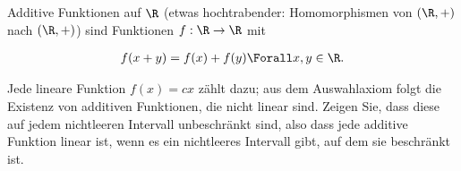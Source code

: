 
\begin{exercise}

Additive Funktionen auf $\R$ (etwas hochtrabender: Homomorphismen von $(\R, +)$ nach $(\R, +)$) sind Funktionen $f: \R \to \R$ mit

\begin{align*}
    f(x + y) = f(x) + f(y)
    \Forall x, y \in \R.
\end{align*}

Jede lineare Funktion $f(x) = c x$ zählt dazu;
aus dem Auswahlaxiom folgt die Existenz von additiven Funktionen, die nicht linear sind.
Zeigen Sie, dass diese  auf jedem nichtleeren Intervall unbeschränkt sind, also dass jede additive Funktion linear ist, wenn es ein nichtleeres Intervall gibt, auf dem sie beschränkt ist.

\end{exercise}


